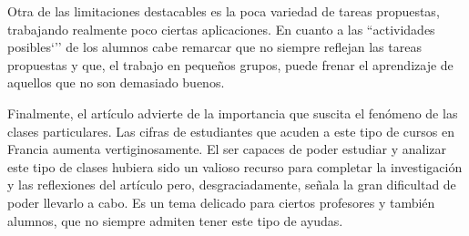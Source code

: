 	Otra de las limitaciones destacables es la poca variedad de tareas propuestas, trabajando realmente poco ciertas aplicaciones. En cuanto a las ``actividades posibles`'' de los alumnos cabe remarcar que no siempre reflejan las tareas propuestas y que, el trabajo en pequeños grupos, puede frenar el aprendizaje de aquellos que no son demasiado buenos. 
	
	Finalmente, el artículo advierte de la importancia que suscita el fenómeno de las clases particulares. Las cifras de estudiantes que acuden a este tipo de cursos en Francia aumenta vertiginosamente. El ser capaces de poder estudiar y analizar este tipo de clases hubiera sido un valioso recurso para completar la investigación y las reflexiones del artículo pero, desgraciadamente, señala la gran dificultad de poder llevarlo a cabo. Es un tema delicado para ciertos profesores y también alumnos, que no siempre admiten tener este tipo de ayudas.
	













